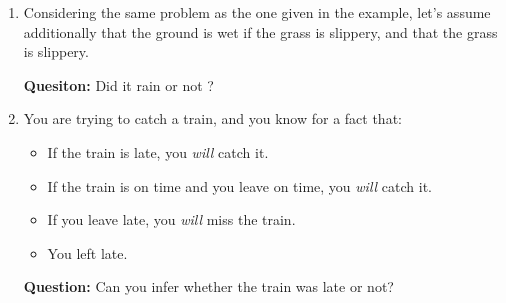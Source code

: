 \documentclass[11pt]{article}
\numberwithin{equation}{section}
\newcommand{\sol}[1]{
    }
\begin{document}
\begin{enumerate}
    \item Considering the same problem as the one given in the example, let's assume additionally that the ground is wet if the grass is slippery, and that the grass is slippery. 
    
    \textbf{Quesiton:} Did it rain or not ?

    \sol{
        On top of knowing that the grass is slippery ($S$), we have a new rule: $S \implies W$.
        We thus know that the ground is wet as well: $W$.

        However, we cannot tell anything about the rain, as the grass being slippery or the ground being wet does not imply anything about the rain: $(S \land W) \centernot\implies R$. 
        We thus cannot say anything about the rain.
    }

    \item You are trying to catch a train, and you know for a fact that:
    \begin{itemize}
        \item If the train is late, you \emph{will} catch it.
        \item If the train is on time and you leave on time, you \emph{will} catch it.
        \item If you leave late, you \emph{will} miss the train.
        \item You left late.
    \end{itemize}
    \textbf{Question:} Can you infer whether the train was late or not?

    \sol{
        \paragraph{Notations}
        \begin{itemize}
            \item The train is on time: $T$.
            \item You left late: $L$.
            \item You catch the train: $C$.
        \end{itemize}

        \paragraph{Knowledge base}
        \begin{enumerate}
            \item If the train is late, you \emph{will} catch it: $\neg T \implies C$.
            \item If the train is on time and you leave on time, you \emph{will} catch it: $(T \land \neg L) \implies C$.
            \item If you leave late, you \emph{will} miss the train: $L \implies \neg C$.
            \item You left late: $L$.
        \end{enumerate}

}
\end{enumerate}
\end{document}
